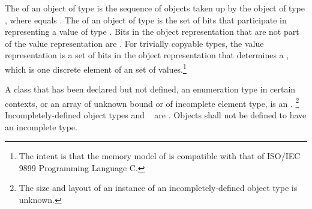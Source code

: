 \pnum
The 
of an object of type  is the
sequence of   objects taken up
by the object of type , where  equals
.
The 
of an object of type  is the set of bits
that participate in representing a value of type .
Bits in the object representation that are not part of the value representation
are .
For trivially copyable types, the value representation is
a set of bits in the object representation that determines a
, which is one discrete element of an
 set of values.\footnote{The
intent is that the memory model of \Cpp{} is compatible
with that of ISO/IEC 9899 Programming Language C.}

\pnum
{}%
A class that has been declared but not defined, an enumeration type in certain
contexts, or an array of unknown
bound or of incomplete element type, is an
.%
\footnote{The size and layout of an instance of an incompletely-defined
object type is unknown.}
Incompletely-defined object types and \cv{}~ are
.
Objects shall not be defined to have an
incomplete type.

